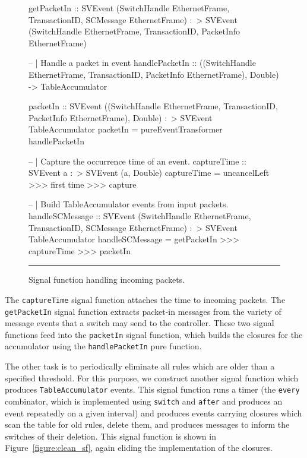 \begin{figure}
\begin{code}
getPacketIn ::     SVEvent (SwitchHandle EthernetFrame,
                            TransactionID,
                            SCMessage EthernetFrame)
               :~> SVEvent (SwitchHandle EthernetFrame,
                            TransactionID,
                            PacketInfo EthernetFrame)

-- | Handle a packet in event
handlePacketIn ::    ((SwitchHandle EthernetFrame,
                       TransactionID,
                       PacketInfo EthernetFrame), Double)
                  -> TableAccumulator

packetIn ::     SVEvent ((SwitchHandle EthernetFrame,
                          TransactionID,
                          PacketInfo EthernetFrame),
                         Double)
            :~> SVEvent TableAccumulator
packetIn = pureEventTransformer handlePacketIn

-- | Capture the occurrence time of an event.
captureTime :: SVEvent a :~> SVEvent (a, Double)
captureTime = uncancelLeft >>>
              first time >>>
              capture

-- | Build TableAccumulator events from input packets.
handleSCMessage ::     SVEvent (SwitchHandle EthernetFrame,
                                TransactionID,
                                SCMessage EthernetFrame)
                   :~> SVEvent TableAccumulator
handleSCMessage = getPacketIn >>> captureTime >>> packetIn

\end{code}
\hrule
\caption{Signal function handling incoming packets.}
\label{figure:packet_in_sf}
\end{figure}

The {\tt captureTime} signal function attaches the time to incoming packets. The
{\tt getPacketIn} signal function extracts packet-in messages from the variety
of message events that a switch may send to the controller. These two signal
functions feed into the {\tt packetIn} signal function, which builds the
closures for the accumulator using the {\tt handlePacketIn} pure function.

The other task is to periodically eliminate all rules which are older than a
specified threshold. For this purpose, we construct another signal function
which produces {\tt TableAccumulator} events. This signal function runs a timer
(the {\tt every} combinator, which is implemented using {\tt switch} and {\tt after}
and produces an event repeatedly on a given interval) and produces events carrying closures which scan
the table for old rules, delete them, and produces messages to inform the
switches of their deletion. This signal function is shown in Figure~\ref{figure:clean_sf},
again eliding the implementation of the closures.

